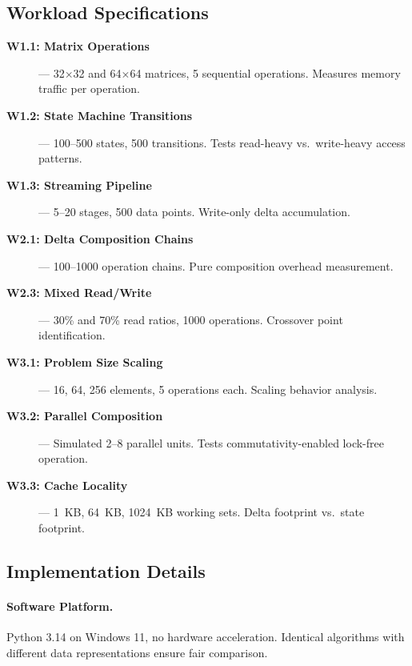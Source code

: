 \documentclass[11pt,letterpaper]{article}
\theoremstyle{plain}
\theoremstyle{definition}
\theoremstyle{remark}
\begin{document}
\subsection{Workload Specifications}

\begin{description}
    \item[\textbf{W1.1: Matrix Operations}] --- 32$\times$32 and 64$\times$64 matrices, 5 sequential operations. Measures memory traffic per operation.

    \item[\textbf{W1.2: State Machine Transitions}] --- 100--500 states, 500 transitions. Tests read-heavy vs.\ write-heavy access patterns.

    \item[\textbf{W1.3: Streaming Pipeline}] --- 5--20 stages, 500 data points. Write-only delta accumulation.

    \item[\textbf{W2.1: Delta Composition Chains}] --- 100--1000 operation chains. Pure composition overhead measurement.

    \item[\textbf{W2.3: Mixed Read/Write}] --- 30\% and 70\% read ratios, 1000 operations. Crossover point identification.

    \item[\textbf{W3.1: Problem Size Scaling}] --- 16, 64, 256 elements, 5 operations each. Scaling behavior analysis.

    \item[\textbf{W3.2: Parallel Composition}] --- Simulated 2--8 parallel units. Tests commutativity-enabled lock-free operation.

    \item[\textbf{W3.3: Cache Locality}] --- 1~KB, 64~KB, 1024~KB working sets. Delta footprint vs.\ state footprint.
\end{description}

\subsection{Implementation Details}

\paragraph{Software Platform.} Python 3.14 on Windows 11, no hardware acceleration. Identical algorithms with different data representations ensure fair comparison.
\end{document}
